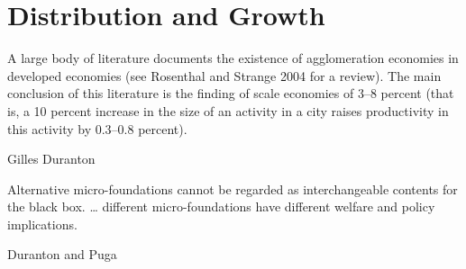 \chapter{Distribution and Growth} \label{chapter-distribution}

\epigraph{A large body of literature documents the existence of agglomeration economies in developed economies (see Rosenthal and Strange 2004 for a review). The main conclusion of this literature is the finding of scale economies of 3--8 percent (that is, a 10 percent increase in the size of an activity in a city raises productivity in this activity by 0.3--0.8 percent).}{Gilles Duranton \cite{durantonAreCitiesEngines2009}} 

\epigraph{Alternative micro-foundations cannot be regarded as interchangeable contents for the black box. \dots%
different micro-foundations have different welfare and policy implications. %
}{Duranton and Puga \cite{durantonMicroFoundationsUrbanAgglomeration2004}}




